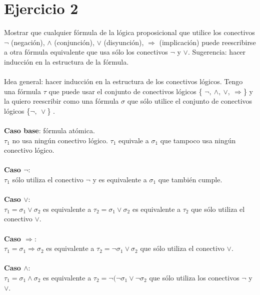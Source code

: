 \documentclass{article}
\begin{document}
\section*{Ejercicio 2}{Mostrar que cualquier fórmula de la lógica proposicional que utilice los conectivos {$\lnot$} (negación), {$\land$} (conjunción),
{$\lor$} (disyunción), {$\Rightarrow$} (implicación) puede reescribirse a otra fórmula equivalente que usa sólo los conectivos {$\lnot$} y {$\lor$}. Sugerencia: hacer inducción en la estructura de la fórmula.}
\\
\\
{Idea general: hacer inducción en la estructura de los conectivos lógicos. Tengo una fórmula $\tau$ que puede usar el conjunto de conectivos lógicos \{ $\lnot, \ \land, \ \lor, \ \Rightarrow$\} y la quiero reescribir como una fórmula $\sigma$ que sólo utilice el conjunto de conectivos lógicos \{$\lnot, \ \lor$\} }.
\\
\\
{\textbf{Caso base}: fórmula atómica. \\ $\tau_{1}$ no usa ningún conectivo lógico. $\tau_{1}$ equivale a $\sigma_{1}$ que tampoco usa ningún conectivo lógico.}
\\
\\
{\textbf{Caso $\lnot$}: \\ $\tau_{1}$ sólo utiliza el conectivo $\lnot$ y es equivalente a $\sigma_{1}$ que también cumple.}
\\
\\
{\textbf{Caso $\lor$}: \\ $\tau_{1} = \sigma_{1} \lor \sigma_{2}$ es equivalente a $\tau_{2} = \sigma_{1} \lor \sigma_{2}$ es equivalente a $\tau_2$ que sólo utiliza el conectivo $\lor$.} 
\\
\\
{\textbf{Caso $\Rightarrow$}: \\ $\tau_{1} = \sigma_{1}\Rightarrow\sigma_{2}$ es equivalente a $\tau_{2} = \lnot\sigma_{1} \lor \sigma_{2}$ que sólo utiliza el conectivo $\lor$.}
\\
\\
{\textbf{Caso $\land$}: \\ $\tau_{1} = \sigma_{1} \land \sigma_{2}$ es equivalente a $\tau_{2}=\lnot(\lnot\sigma_{1} \lor \lnot\sigma_{2}$ que sólo utiliza los conectivos $\lnot$ y $\lor$.}
\end{document}
